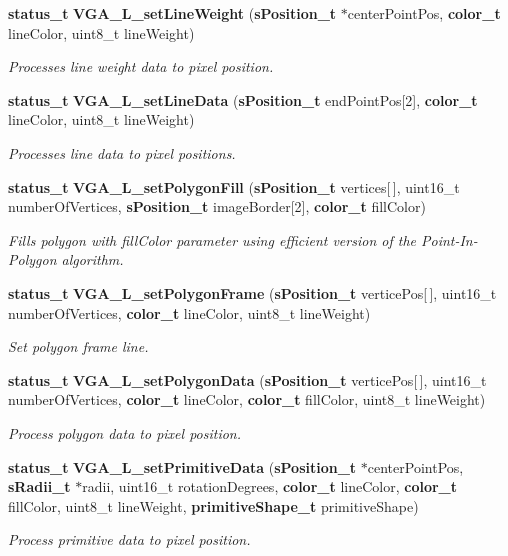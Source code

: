 \begin{DoxyCompactItemize}
\item 
{\bf status\+\_\+t} {\bf V\+G\+A\+\_\+\+L\+\_\+set\+Line\+Weight} ({\bf s\+Position\+\_\+t} $\ast$center\+Point\+Pos, {\bf color\+\_\+t} line\+Color, uint8\+\_\+t line\+Weight)
\begin{DoxyCompactList}\small\item\em Processes line weight data to pixel position. \end{DoxyCompactList}\item 
{\bf status\+\_\+t} {\bf V\+G\+A\+\_\+\+L\+\_\+set\+Line\+Data} ({\bf s\+Position\+\_\+t} end\+Point\+Pos[2], {\bf color\+\_\+t} line\+Color, uint8\+\_\+t line\+Weight)
\begin{DoxyCompactList}\small\item\em Processes line data to pixel positions. \end{DoxyCompactList}\item 
{\bf status\+\_\+t} {\bf V\+G\+A\+\_\+\+L\+\_\+set\+Polygon\+Fill} ({\bf s\+Position\+\_\+t} vertices[$\,$], uint16\+\_\+t number\+Of\+Vertices, {\bf s\+Position\+\_\+t} image\+Border[2], {\bf color\+\_\+t} fill\+Color)
\begin{DoxyCompactList}\small\item\em Fills polygon with fill\+Color parameter using efficient version of the Point-\/\+In-\/\+Polygon algorithm. \end{DoxyCompactList}\item 
{\bf status\+\_\+t} {\bf V\+G\+A\+\_\+\+L\+\_\+set\+Polygon\+Frame} ({\bf s\+Position\+\_\+t} vertice\+Pos[$\,$], uint16\+\_\+t number\+Of\+Vertices, {\bf color\+\_\+t} line\+Color, uint8\+\_\+t line\+Weight)
\begin{DoxyCompactList}\small\item\em Set polygon frame line. \end{DoxyCompactList}\item 
{\bf status\+\_\+t} {\bf V\+G\+A\+\_\+\+L\+\_\+set\+Polygon\+Data} ({\bf s\+Position\+\_\+t} vertice\+Pos[$\,$], uint16\+\_\+t number\+Of\+Vertices, {\bf color\+\_\+t} line\+Color, {\bf color\+\_\+t} fill\+Color, uint8\+\_\+t line\+Weight)
\begin{DoxyCompactList}\small\item\em Process polygon data to pixel position. \end{DoxyCompactList}\item 
{\bf status\+\_\+t} {\bf V\+G\+A\+\_\+\+L\+\_\+set\+Primitive\+Data} ({\bf s\+Position\+\_\+t} $\ast$center\+Point\+Pos, {\bf s\+Radii\+\_\+t} $\ast$radii, uint16\+\_\+t rotation\+Degrees, {\bf color\+\_\+t} line\+Color, {\bf color\+\_\+t} fill\+Color, uint8\+\_\+t line\+Weight, {\bf primitive\+Shape\+\_\+t} primitive\+Shape)
\begin{DoxyCompactList}\small\item\em Process primitive data to pixel position. \end{DoxyCompactList}\end{DoxyCompactItemize}


